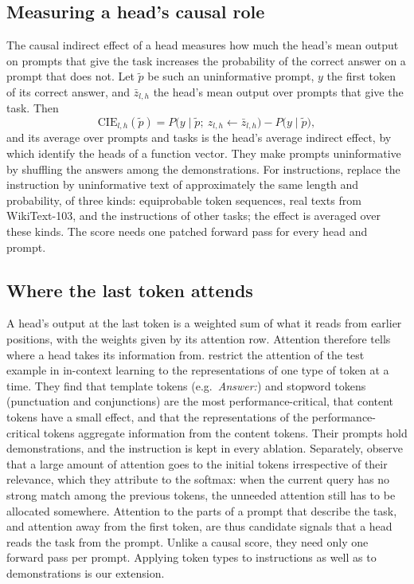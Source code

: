 \documentclass[10pt,a4paper]{article}
\newcommand{\zbar}{\bar z}
\begin{document}
\subsection{Measuring a head's causal role}\label{sec:bg-cie}

The causal indirect effect of a head \citep{todd2024function} measures how much the head's mean output on prompts that give the task increases the probability of the correct answer on a prompt that does not. Let $\tilde p$ be such an uninformative prompt, $y$ the first token of its correct answer, and $\zbar_{l,h}$ the head's mean output over prompts that give the task. Then
\begin{equation}
\mathrm{CIE}_{l,h}(\tilde p) = P\big(y \mid \tilde p;\ z_{l,h} \leftarrow \zbar_{l,h}\big) - P\big(y \mid \tilde p\big),
\end{equation}
and its average over prompts and tasks is the head's average indirect effect, by which \citet{todd2024function} identify the heads of a function vector. They make prompts uninformative by shuffling the answers among the demonstrations. For instructions, \citet[Sec.~2.1]{davidson2025different} replace the instruction by uninformative text of approximately the same length and probability, of three kinds: equiprobable token sequences, real texts from WikiText-103, and the instructions of other tasks; the effect is averaged over these kinds. The score needs one patched forward pass for every head and prompt.

\subsection{Where the last token attends}\label{sec:bg-attention}

A head's output at the last token is a weighted sum of what it reads from earlier positions, with the weights given by its attention row. Attention therefore tells where a head takes its information from. \citet{bai2026performance} restrict the attention of the test example in in-context learning to the representations of one type of token at a time. They find that template tokens (e.g.\ \emph{Answer:}) and stopword tokens (punctuation and conjunctions) are the most performance-critical, that content tokens have a small effect, and that the representations of the performance-critical tokens aggregate information from the content tokens. Their prompts hold demonstrations, and the instruction is kept in every ablation. Separately, \citet{xiao2024efficient} observe that a large amount of attention goes to the initial tokens irrespective of their relevance, which they attribute to the softmax: when the current query has no strong match among the previous tokens, the unneeded attention still has to be allocated somewhere. Attention to the parts of a prompt that describe the task, and attention away from the first token, are thus candidate signals that a head reads the task from the prompt. Unlike a causal score, they need only one forward pass per prompt. Applying token types to instructions as well as to demonstrations is our extension.
\end{document}
